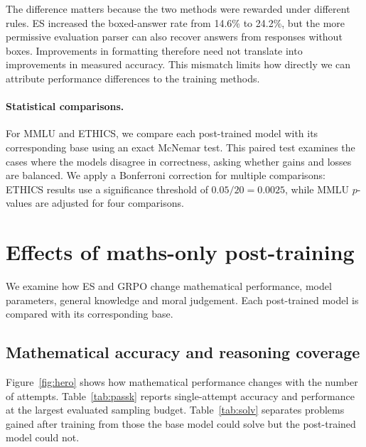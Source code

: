\documentclass[10pt]{article}
\begin{document}
The difference matters because the two methods were rewarded under different rules. ES increased the boxed-answer rate from 14.6\% to 24.2\%, but the more permissive evaluation parser can also recover answers from responses without boxes. Improvements in formatting therefore need not translate into improvements in measured accuracy. This mismatch limits how directly we can attribute performance differences to the training methods.

\paragraph{Statistical comparisons.} For MMLU and ETHICS, we compare each post-trained model with its corresponding base using an exact McNemar test. This paired test examines the cases where the models disagree in correctness, asking whether gains and losses are balanced. We apply a Bonferroni correction for multiple comparisons: ETHICS results use a significance threshold of $0.05/20 = 0.0025$, while MMLU $p$-values are adjusted for four comparisons.

\section{Effects of maths-only post-training}\label{sec:results}
We examine how ES and GRPO change mathematical performance, model parameters, general knowledge and moral judgement. Each post-trained model is compared with its corresponding base.

\subsection{Mathematical accuracy and reasoning coverage}\label{sec:reasoning}
Figure~\ref{fig:hero} shows how mathematical performance changes with the number of attempts. Table~\ref{tab:passk} reports single-attempt accuracy and performance at the largest evaluated sampling budget. Table~\ref{tab:solv} separates problems gained after training from those the base model could solve but the post-trained model could not.
\end{document}
